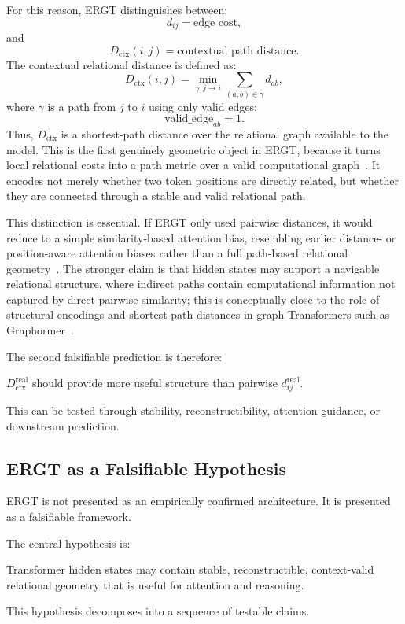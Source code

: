 \documentclass[11pt]{article}
\begin{document}
For this reason, ERGT distinguishes between:
\[
d_{ij}
=
\text{edge cost},
\]
and
\[
D_{\mathrm{ctx}}(i,j)
=
\text{contextual path distance}.
\]
The contextual relational distance is defined as:
\[
D_{\mathrm{ctx}}(i,j)
=
\min_{\gamma:j\to i}
\sum_{(a,b)\in\gamma}d_{ab},
\]
where $\gamma$ is a path from $j$ to $i$ using only valid edges:
\[
\mathrm{valid\_edge}_{ab}=1.
\]
Thus, $D_{\mathrm{ctx}}$ is a shortest-path distance over the relational graph available to the model. This is the first genuinely geometric object in ERGT, because it turns local relational costs into a path metric over a valid computational graph~\cite{dijkstra1959note,chung1997spectral}. It encodes not merely whether two token positions are directly related, but whether they are connected through a stable and valid relational path.

This distinction is essential. If ERGT only used pairwise distances, it would reduce to a simple similarity-based attention bias, resembling earlier distance- or position-aware attention biases rather than a full path-based relational geometry~\cite{shaw2018self,press2021train}. The stronger claim is that hidden states may support a navigable relational structure, where indirect paths contain computational information not captured by direct pairwise similarity; this is conceptually close to the role of structural encodings and shortest-path distances in graph Transformers such as Graphormer~\cite{ying2021graphormer}.

The second falsifiable prediction is therefore:
\begin{ergtclaim}
$D_{\mathrm{ctx}}^{\mathrm{real}}$ should provide more useful structure than pairwise $d_{ij}^{\mathrm{real}}$.
\end{ergtclaim}
This can be tested through stability, reconstructibility, attention guidance, or downstream prediction.

\subsection{ERGT as a Falsifiable Hypothesis}

ERGT is not presented as an empirically confirmed architecture. It is presented as a falsifiable framework.

The central hypothesis is:
\begin{ergtclaim}
Transformer hidden states may contain stable, reconstructible, context-valid relational geometry that is useful for attention and reasoning.
\end{ergtclaim}
This hypothesis decomposes into a sequence of testable claims.
\end{document}

